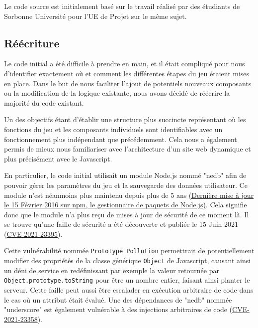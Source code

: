 \documentclass[a4paper, 12pt]{report}
\begin{document}
        
        Le code source est initialement basé sur le travail réalisé par des étudiants de Sorbonne Université 
        pour l'UE de Projet sur le même sujet.
        
        \subsection{Réécriture}
        Le code initial a été difficile à prendre en main, et il était compliqué pour nous d'identifier 
        exactement où et comment les différentes étapes du jeu étaient mises en place. Dans le 
        but de nous faciliter l'ajout de potentiels nouveaux composants ou la modification 
        de la logique existante, nous avons décidé de réécrire la majorité du code existant.
        
        Un des objectifs étant d'établir une structure plus succincte représentant où les
        fonctions du jeu et les composants individuels sont identifiables avec un fonctionnement
        plus indépendant que précédemment. Cela nous a également permis de mieux nous familiariser
        avec l'architecture d'un site web dynamique et plus précisément avec le Javascript.
        
        En particulier, le code initial utilisait un module Node.js nommé "nedb" afin de pouvoir gérer 
        les paramètres du jeu et la sauvegarde des données utilisateur. Ce module n'est néanmoins plus
        maintenu depuis plus de 5 ans \href{https://www.npmjs.com/package/nedb}{(Dernière mise à jour le 15 Février 2016 sur 
        npm, le gestionnaire de paquets de Node.js)}. Cela signifie donc que le module n'a plus reçu de 
        mises à jour de sécurité de ce moment là. Il se trouve qu'une faille de sécurité a été découverte et publiée
        le 15 Juin 2021 (\href{https://nvd.nist.gov/vuln/detail/CVE-2021-23395}{CVE-2021-23395}). 
        
        Cette vulnérabilité nommée \verb+Prototype Pollution+ permettrait de potentiellement modifier des propriétés de 
        la classe générique \verb+Object+ de Javascript, causant ainsi un déni de service en redéfinissant 
        par exemple la valeur retournée par \verb+Object.prototype.toString+ pour être un nombre entier, faisant 
        ainsi planter le serveur. Cette faille peut aussi être escalader en exécution arbitraire de code 
        dans le cas où un attribut était évalué. Une des dépendances de "nedb" nommée "underscore" est également vulnérable à des injections arbitraires de code 
        (\href{https://nvd.nist.gov/vuln/detail/CVE-2021-23358}{CVE-2021-23358}).
        
\end{document}
